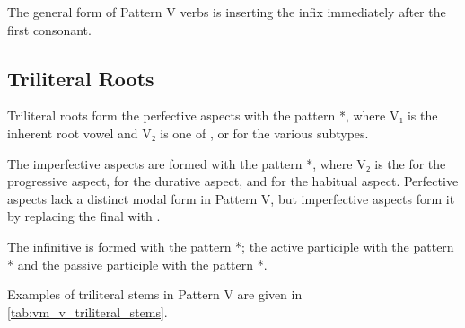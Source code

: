 \documentclass[grammar]{subfiles}
\begin{document}

The general form of Pattern V verbs is inserting the infix  immediately
after the first consonant.  


\subsection{Triliteral Roots}
\label{ssec:vm_v_triliteral_roots}

Triliteral roots form the perfective aspects with the pattern
*, where V₁ is the inherent root vowel and V₂ is one of ,
 or  for the various subtypes.  

The imperfective aspects are formed with the pattern *, where
V₂ is the  for the progressive aspect,  for the durative aspect,
and  for the habitual aspect.  Perfective aspects lack a distinct modal
form in Pattern V, but imperfective aspects form it by replacing the final
 with . 

The infinitive is formed with the pattern *; the active
participle with the pattern * and the passive participle with the
pattern *. 

Examples of triliteral stems in Pattern V are given in
\cref{tab:vm_v_triliteral_stems}. 
\end{document}
